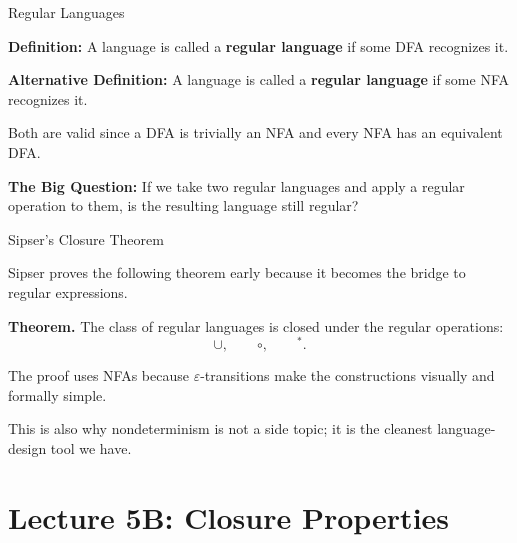 \documentclass[10pt,aspectratio=169]{beamer}
\newcommand{\eps}{\varepsilon}
\begin{document}
\begin{frame}{Regular Languages}

\textbf{Definition:} A language is called a \textbf{regular language} if some DFA recognizes it.

\vspace{1em}

\textbf{Alternative Definition:} A language is called a \textbf{regular language} if some NFA recognizes it.

\vspace{1em}

Both are valid since a DFA is trivially an NFA and every NFA has an equivalent DFA.
\vspace{1em}
\pause

\textbf{The Big Question:} 
If we take two regular languages and apply a regular operation to them, is the resulting language still regular?

\end{frame}


\begin{frame}{Sipser's Closure Theorem}

Sipser proves the following theorem early because it becomes the bridge to regular expressions.

\vspace{0.8em}
\textbf{Theorem.} The class of regular languages is closed under the regular operations:
\[
\cup,\qquad \circ,\qquad ^*.
\]

\vspace{0.8em}
\pause
The proof uses NFAs because $\eps$-transitions make the constructions visually and formally simple.

\vspace{0.8em}
This is also why nondeterminism is not a side topic; it is the cleanest language-design tool we have.

\end{frame}

\section{Lecture 5B: Closure Properties}
\end{document}
